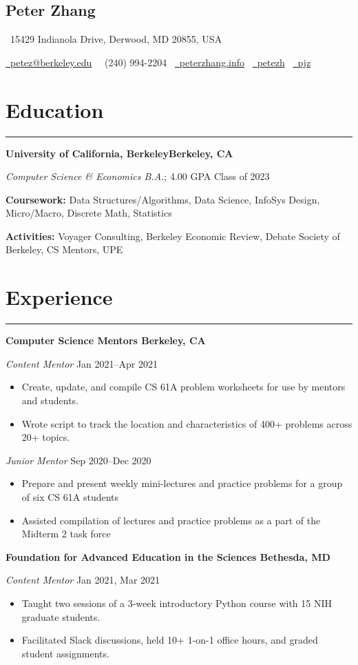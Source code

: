 \documentclass[11pt]{article}
\newcommand{\name}[1]{\begin{center}\section*{\huge \color{highlight} #1}\vspace{-0.5cm}\end{center}}
\newcommand{\topinfo}[1]{\begin{center}\vspace{-0.2cm}#1\vspace{-0.2cm}\end{center}}
\newcommand{\resumesection}[1]{\vspace{-0.6cm}\section*{\color{highlight}#1}\vspace{-0.3cm}\hrule\vspace{0.2cm}}
\begin{document}
\name{Peter Zhang}
\topinfo{\faHome \ 15429 Indianola Drive, Derwood, MD 20855, USA}
\topinfo{\href{mailto:petez@berkeley.edu}{\faEnvelope \ petez@berkeley.edu} \ \faPhone \ (240) 994-2204 \ \href{https://peterzhang.info/}{\faBriefcase \ peterzhang.info} \  \href{https://github.com/petezh}{\faGithub \ petezh} \  \href{https://www.linkedin.com/in/pjz/}{\faLinkedinSquare \ pjz}}

\resumesection{Education}

\textbf{University of California, Berkeley\hfill Berkeley, CA} \par
\textit{Computer Science \& Economics B.A.}; 4.00 GPA \hfill Class of 2023\par
\textbf{Coursework:} Data Structures/Algorithms, Data Science, InfoSys Design, Micro/Macro, Discrete Math, Statistics\par
\textbf{Activities:} Voyager Consulting, Berkeley Economic Review, Debate Society of Berkeley, CS Mentors, UPE

\resumesection{Experience}


\textbf{Computer Science Mentors \hfill Berkeley, CA} \par
\textit{Content Mentor} \hfill Jan 2021--Apr 2021 \par
\begin{itemize}
	\item Create, update, and compile CS 61A problem worksheets for use by mentors and students.
	\item Wrote script to track the location and characteristics of 400+ problems across 20+ topics.
\end{itemize}\vspace{0.1cm}

\textit{Junior Mentor} \hfill Sep 2020--Dec 2020 \par
\begin{itemize}
	\item Prepare and present weekly mini-lectures and practice problems for a group of six CS 61A students
	\item Assisted compilation of lectures and practice problems as a part of the Midterm 2 task force
\end{itemize}\vspace{0.1cm}

\textbf{Foundation for Advanced Education in the Sciences \hfill Bethesda, MD} \par
\textit{Content Mentor} \hfill Jan 2021, Mar 2021 \par
\begin{itemize}
	\item Taught two sessions of a 3-week introductory Python course with 15 NIH graduate students.
	\item Facilitated Slack discussions, held 10+ 1-on-1 office hours, and graded student assignments.
\end{itemize}\vspace{0.1cm}
\end{document}
